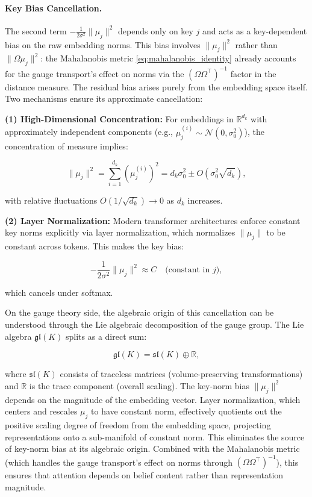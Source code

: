 \documentclass[twoside,11pt]{article}
\begin{document}
\paragraph{Key Bias Cancellation.}

The second term $-\frac{1}{2\sigma^2}\|\mu_j\|^2$ depends only on key $j$ and acts as a key-dependent bias on the raw embedding norms. This bias involves $\|\mu_j\|^2$ rather than $\|\Omega\mu_j\|^2$: the Mahalanobis metric \eqref{eq:mahalanobis_identity} already accounts for the gauge transport's effect on norms via the $(\Omega\Omega^\top)^{-1}$ factor in the distance measure. The residual bias arises purely from the embedding space itself. Two mechanisms ensure its approximate cancellation:

\textbf{(1) High-Dimensional Concentration:}
For embeddings in $\mathbb{R}^{d_k}$ with approximately independent components (e.g., $\mu_j^{(i)} \sim \mathcal{N}(0, \sigma_0^2)$), the concentration of measure implies:

\begin{equation}
\|\mu_j\|^2 = \sum_{i=1}^{d_k} (\mu_j^{(i)})^2 = d_k\sigma_0^2 \pm O(\sigma_0^2\sqrt{d_k}),
\end{equation}

with relative fluctuations $O(1/\sqrt{d_k}) \to 0$ as $d_k$ increases.

\textbf{(2) Layer Normalization:}
Modern transformer architectures enforce constant key norms explicitly via layer normalization, which normalizes $\|\mu_j\|$ to be constant across tokens. This makes the key bias:

\begin{equation}
-\frac{1}{2\sigma^2}\|\mu_j\|^2 \approx C \quad \text{(constant in } j\text{)},
\end{equation}

which cancels under softmax.

On the gauge theory side, the algebraic origin of this cancellation can be understood through the Lie algebraic decomposition of the gauge group. The Lie algebra $\mathfrak{gl}(K)$ splits as a direct sum:

\begin{equation}
\mathfrak{gl}(K) = \mathfrak{sl}(K) \oplus \mathbb{R},
\label{eq:gl_decomposition}
\end{equation}

where $\mathfrak{sl}(K)$ consists of traceless matrices (volume-preserving transformations) and $\mathbb{R}$ is the trace component (overall scaling). The key-norm bias $\|\mu_j\|^2$ depends on the magnitude of the embedding vector. Layer normalization, which centers and rescales $\mu_j$ to have constant norm, effectively quotients out the positive scaling degree of freedom from the embedding space, projecting representations onto a sub-manifold of constant norm. This eliminates the source of key-norm bias at its algebraic origin. Combined with the Mahalanobis metric (which handles the gauge transport's effect on norms through $(\Omega\Omega^\top)^{-1}$), this ensures that attention depends on belief content rather than representation magnitude.
\end{document}
